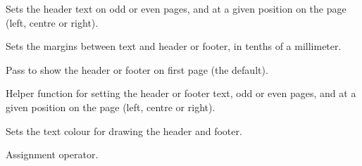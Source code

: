 \label{wxrichtextheaderfooterdatasetheadertext}


Sets the header text on odd or even pages, and at a given position on the page (left, centre or right).

\label{wxrichtextheaderfooterdatasetmargins}


Sets the margins between text and header or footer, in tenths of a millimeter.

\label{wxrichtextheaderfooterdatasetshowonfirstpage}


Pass \true to show the header or footer on first page (the default).

\label{wxrichtextheaderfooterdatasettext}


Helper function for setting the header or footer text, odd or even pages, and at a given position on the page (left, centre or right).

\label{wxrichtextheaderfooterdatasettextcolour}


Sets the text colour for drawing the header and footer.

\label{wxrichtextheaderfooterdataoperatorassign}


Assignment operator.

